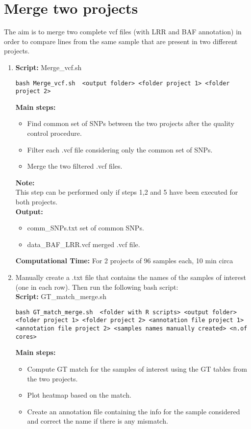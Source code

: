 \documentclass[11pt]{paper}
\begin{document}
\section{Merge two projects}
The aim is to merge two complete vcf files (with LRR and BAF annotation) in order to compare lines from the same sample that are present in two different projects.
\begin{enumerate}
\item \textbf{Script:} Merge\_vcf.sh
\begin{verbatim}
bash Merge_vcf.sh  <output folder> <folder project 1> <folder project 2>  
\end{verbatim}
\textbf{Main steps:}
\begin{itemize}
\item Find common set of SNPs between the two projects after the quality control procedure.
\item Filter each .vcf file considering only the common set of SNPs.
\item Merge the two filtered .vcf files.
\end{itemize}
\textbf{Note:}\\
This step can be performed only if steps 1,2 and 5 have been executed for both projects.\\
\textbf{Output:}
\begin{itemize}
\item comm\_SNPs.txt set of common SNPs.
\item data\_BAF\_LRR.vcf merged .vcf file.
\end{itemize}
\textbf{Computational Time:} For 2 projects of 96 samples each, 10 min circa 
\item Manually create a .txt file that contains the names of the samples of interest (one in each row). Then run the following bash script:\\
\textbf{Script:} GT\_match\_merge.sh
\begin{verbatim}
bash GT_match_merge.sh  <folder with R scripts> <output folder> 
<folder project 1> <folder project 2> <annotation file project 1> 
<annotation file project 2> <samples names manually created> <n.of cores>
\end{verbatim}
\textbf{Main steps:}
\begin{itemize}
\item Compute GT match for the samples of interest using the GT tables from the two projects.
\item Plot heatmap based on the match.
\item Create an annotation file containing the info for the sample considered and correct the name if there is any mismatch.

\end{itemize}
\end{enumerate}
\end{document}
